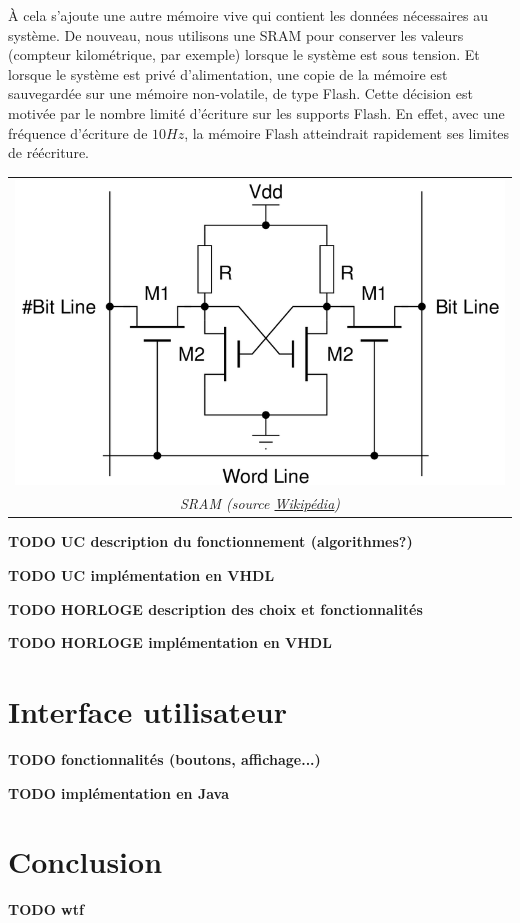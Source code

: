 \documentclass[a4paper]{article} %
\begin{document}
À cela s'ajoute une autre mémoire vive qui contient les données nécessaires au système.
De nouveau, nous utilisons une SRAM pour conserver les valeurs (compteur kilométrique, par exemple) lorsque le système est sous tension.
Et lorsque le système est privé d'alimentation, une copie de la mémoire est sauvegardée sur une mémoire non-volatile, de type Flash.
Cette décision est motivée par le nombre limité d'écriture sur les supports Flash.
En effet, avec une fréquence d'écriture de $10 H\!z$, la mémoire Flash atteindrait rapidement ses limites de réécriture.

\begin{center}
\begin{tabular}{c}
\includegraphics[scale=0.3]{4T_SRAM_Cell.png} \\
\textit{SRAM (source \href{http://en.wikipedia.org/wiki/Static_random-access_memory}{Wikipédia})}
\end{tabular}
\end{center}

\textbf{TODO UC description du fonctionnement (algorithmes?)}

\textbf{TODO UC implémentation en VHDL}

\textbf{TODO HORLOGE description des choix et fonctionnalités}

\textbf{TODO HORLOGE implémentation en VHDL}


\section{Interface utilisateur}

\textbf{TODO fonctionnalités (boutons, affichage...)}

\textbf{TODO implémentation en Java}


\section{Conclusion}

\textbf{TODO wtf}
\end{document}
